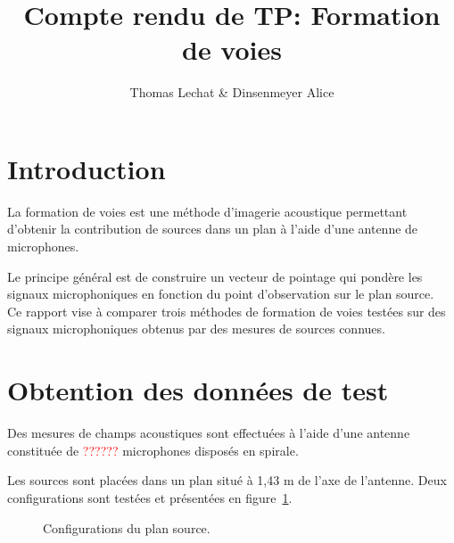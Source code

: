 \documentclass[a4paper]{article}
\title{Compte rendu de TP: Formation de voies }
\author{Thomas Lechat \& Dinsenmeyer Alice}
\begin{document}
\maketitle



\section{Introduction}

La formation de voies est une méthode d'imagerie acoustique permettant d'obtenir la contribution de sources dans un plan à l'aide d'une antenne de microphones. 

Le principe général est de construire un vecteur de pointage qui pondère les signaux microphoniques en fonction du point d'observation sur le plan source.\\

Ce rapport vise à comparer trois méthodes de formation de voies testées sur des signaux microphoniques obtenus par des mesures de sources connues. 

\section{Obtention des données de test}

Des mesures de champs acoustiques sont effectuées à l'aide d'une antenne constituée de \textcolor{red}{??????} microphones disposés en spirale.

Les sources sont placées dans un plan situé à 1,43 m de l'axe de l'antenne. Deux configurations sont testées et présentées en figure~\ref{exp}.

\begin{figure}[!h]
	\hspace{1cm}
	\caption{\label{exp} Configurations du plan source.}
\end{figure}
\end{document}
